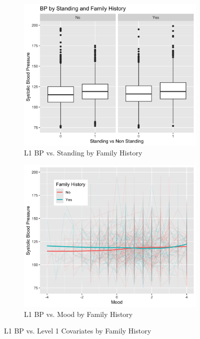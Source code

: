 \documentclass[12pt,twoside,letterpaper]{article}
\theoremstyle{definition}
\theoremstyle{definition}
\begin{document}
\begin{figure}
    \begin{subfigure}{0.48\textwidth}
        \centering
        \includegraphics[width=\textwidth]{pics/bp v stand and fh.png}
        \caption{{\small L1 BP vs. Standing by Family History}}
        \label{fig: bp v stand and fh}
    \end{subfigure}
    \hfill
    \begin{subfigure}{0.48\textwidth}
        \centering
        \includegraphics[width=\textwidth]{pics/bp v mood and fh.png}
        \caption{{\small L1 BP vs. Mood by Family History}}
        \label{fig: bp v mood and fh}
    \end{subfigure}
    \caption{{\small L1 BP vs. Level 1 Covariates by Family History}}
    \label{fig: bp v level1 and fh2}
\end{figure}
\end{document}
